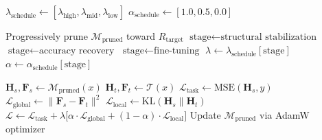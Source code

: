 \documentclass{article}
\begin{document}
\begin{algorithm}[H]
\caption{Pruning-Aware Dynamic Distillation Weight Scheduling}
\label{alg:dynamic_distillation}
\begin{algorithmic}[1]

\State {}
\State $\lambda_{\text{schedule}} \gets [\lambda_{\text{high}}, \lambda_{\text{mid}}, \lambda_{\text{low}}]$
\State $\alpha_{\text{schedule}} \gets [1.0, 0.5, 0.0]$

\State {}
    \State Progressively prune $\mathcal{M}_{\text{pruned}}$ toward $R_{\text{target}}$
    \State {}
        \State $\text{stage} \gets \text{structural stabilization}$
        \State $\text{stage} \gets \text{accuracy recovery}$
    \Else
        \State $\text{stage} \gets \text{fine-tuning}$
    \EndIf
    \State $\lambda \gets \lambda_{\text{schedule}}[\text{stage}]$
    \State $\alpha \gets \alpha_{\text{schedule}}[\text{stage}]$

    \State {}
            \State $\mathbf{H}_s, \mathbf{F}_s \gets \mathcal{M}_{\text{pruned}}(x)$
            \State $\mathbf{H}_t, \mathbf{F}_t \gets \mathcal{T}(x)$
            \State $\mathcal{L}_{\text{task}} \gets \text{MSE}(\mathbf{H}_s, y)$
            \State $\mathcal{L}_{\text{global}} \gets \| \mathbf{F}_s - \mathbf{F}_t \|^2$
            \State $\mathcal{L}_{\text{local}} \gets \text{KL}(\mathbf{H}_s \| \mathbf{H}_t)$
            \State $\mathcal{L} \gets \mathcal{L}_{\text{task}} + \lambda \big[ \alpha \cdot \mathcal{L}_{\text{global}} + (1 - \alpha) \cdot \mathcal{L}_{\text{local}} \big]$
            \State Update $\mathcal{M}_{\text{pruned}}$ via AdamW optimizer
        \EndFor
    \EndFor
\EndFor
\State {}
\end{algorithmic}
\end{algorithm}
\end{document}
